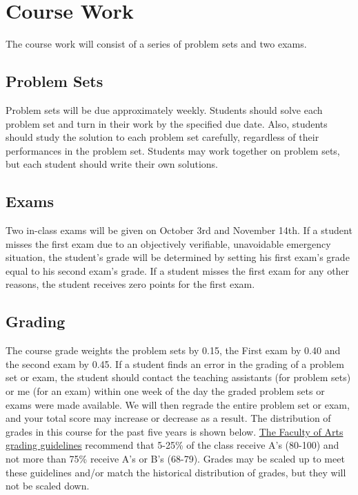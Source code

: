 \documentclass[10pt]{article}
\begin{document}
\section{Course Work}

The course work will consist of a series of problem sets and two
exams. 

\subsection{Problem Sets}
Problem sets will be due approximately weekly.  Students should solve
each problem set and turn in their work by the specified due
date. Also, students should study the solution to each problem set
carefully, regardless of their performances in the problem
set. Students may work together on problem sets, but each student
should write their own solutions.

\subsection{Exams}
Two in-class exams will be given on October 3rd and November 14th. If
a student misses the first exam due to an objectively verifiable,
unavoidable emergency situation, the student's grade will be
determined by setting his first exam's grade equal to his second
exam's grade. If a student misses the first exam for any other
reasons, the student receives zero points for the first exam.

\subsection{Grading}
The course grade weights the problem sets by 0.15, the First exam by
0.40 and the second exam by 0.45. If a student finds an error in the
grading of a problem set or exam, the student should contact the
teaching assistants (for problem sets) or me (for an exam) within one
week of the day the graded problem sets or exams were made
available. We will then regrade the entire problem set or exam, and
your total score may increase or decrease as a result.  The
distribution of grades in this course for the past five years is shown
below.
\href{http://www.arts.ubc.ca/faculty-amp-staff/resources/courses-and-grading/grading-guidelines.html}
{The Faculty of Arts grading guidelines} recommend that 5-25\% of the
class receive A's (80-100) and not more than 75\% receive A's or B's
(68-79). Grades may be scaled up to meet these guidelines and/or match
the historical distribution of grades, but they will not be scaled
down.
\end{document}
